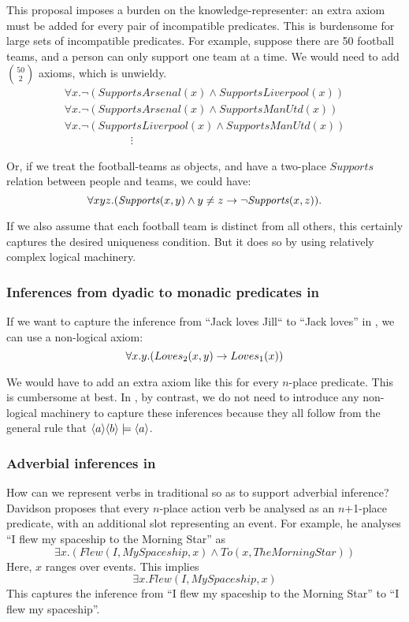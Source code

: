 \NI This proposal imposes a burden on the knowledge-representer: an
extra axiom must be added for every pair of incompatible predicates.
This is burdensome for large sets of incompatible predicates.  For
example, suppose there are 50 football teams, and a person can only
support one team at a time.  We would need to add ${50 \choose
  2}$ axioms, which is unwieldy.
\[
\begin{array}{l}
  \forall x.  \neg (\mathit{SupportsArsenal}(x) \land \mathit{SupportsLiverpool}(x))  \\
  \forall x.  \neg (\mathit{SupportsArsenal}(x) \land \mathit{SupportsManUtd}(x))  \\
  \forall x.  \neg (\mathit{SupportsLiverpool}(x) \land \mathit{SupportsManUtd}(x))  \\
  \qquad \qquad \qquad \vdots
\end{array}
\]

\NI Or, if we treat the football-teams as objects, and have a
two-place $Supports$ relation between people and teams, we could have:
\[
   \forall x y z . (\mathit{Supports}(x,y) \land y \neq z \rightarrow \neg \mathit{Supports}(x,z)).
\]   

\NI If we also assume that each football team is distinct from all 
others, this certainly captures the desired uniqueness condition.  But
it does so by using relatively complex logical machinery.



\subsubsection{Inferences from dyadic to monadic predicates in \fol{}}
If we want to capture the inference from ``Jack loves Jill`` to ``Jack
loves'' in \fol{}, we can use a non-logical axiom:
\[
   \forall x. y .( Loves_2(x,y) \rightarrow Loves_1(x))
\]

\NI We would have to add an extra  axiom like this for every
$n$-place predicate.  This is cumbersome at best.  In \cathoristic{}, by
contrast, we do not need to introduce any non-logical machinery 
to capture these inferences because they all follow from the general
rule that $\MAY{a} \MAY{b} \models \MAY{a}$.

\subsubsection{Adverbial inferences in \fol{}}

\NI How can we represent verbs in traditional \fol{} so as to
support adverbial inference?  Davidson \cite{davidson2} proposes that
every $n$-place action verb be analysed as an $n$+1-place predicate,
with an additional slot representing an event.  For example, he
analyses ``I flew my spaceship to the Morning Star'' as
\[
\exists x. ( Flew(I, \mathit{MySpaceship}, x) \land To(x, \mathit{TheMorningStar}))
\]
Here, $x$ ranges over events. This implies 
\[
\exists x.  Flew(I, \mathit{MySpaceship}, x)
\]
This captures the inference from ``I flew my spaceship to the Morning
Star'' to ``I flew my spaceship''.

